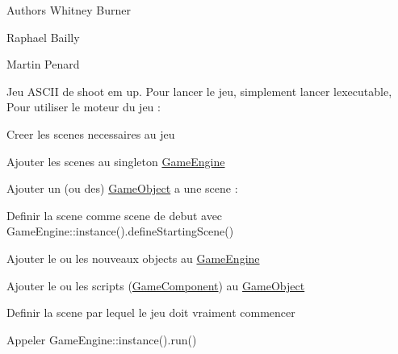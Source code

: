 \begin{DoxyAuthor}{Authors}
Whitney Burner 

Raphael Bailly 

Martin Penard
\end{DoxyAuthor}
Jeu A\+S\+C\+II de shoot \textquotesingle{}em up. Pour lancer le jeu, simplement lancer l\textquotesingle{}executable, Pour utiliser le moteur du jeu \+:
\begin{DoxyItemize}
\item Creer les scenes necessaires au jeu
\item Ajouter les scenes au singleton \hyperlink{class_game_engine}{Game\+Engine}
\item Ajouter un (ou des) \hyperlink{class_game_object}{Game\+Object} a une scene \+:
\begin{DoxyItemize}
\item Definir la scene comme scene de debut avec Game\+Engine\+::instance().define\+Starting\+Scene()
\item Ajouter le ou les nouveaux objects au \hyperlink{class_game_engine}{Game\+Engine}
\item Ajouter le ou les scripts (\hyperlink{class_game_component}{Game\+Component}) au \hyperlink{class_game_object}{Game\+Object}
\end{DoxyItemize}
\item Definir la scene par lequel le jeu doit vraiment commencer
\item Appeler Game\+Engine\+::instance().run() 
\end{DoxyItemize}